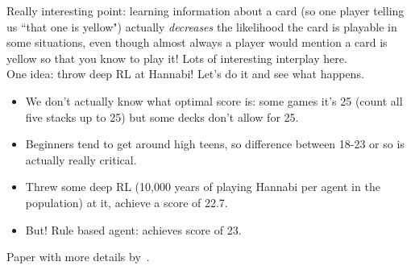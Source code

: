 Really interesting point: learning information about a card (so one player telling us ``that one is yellow") actually {\it decreases} the likelihood the card is playable in some situations, even though almost always a player would mention a card is yellow so that you know to play it! Lots of interesting interplay here. \\

One idea: throw deep RL at Hannabi! Let's do it and see what happens.
\begin{itemize}
    \item We don't actually know what optimal score is: some games it's 25 (count all five stacks up to 25) but some decks don't allow for 25.
    \item Beginners tend to get around high teens, so difference between 18-23 or so is actually really critical.
    \item Threw some deep RL (10,000 years of playing Hannabi per agent in the population) at it, achieve a score of 22.7.
    \item But! Rule based agent: achieves score of 23.
\end{itemize}

Paper with more details by~\citet{bard2019hanabi}. \\


\spacerule

